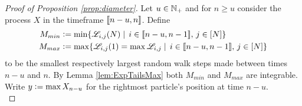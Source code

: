 \begin{proof}[Proof of Proposition \ref{prop:diameter}]
Let $u \in \mathbb{N}_+$ and for $n \geq u$ consider the process $X$ in the timeframe $\llbracket n - u, n\rrbracket$. Define 
\begin{align*}
M_{min} &\vcentcolon= \min\{ \mathscr{L}_{i, j}(N) \mid\, i \in \llbracket n-u, n-1\rrbracket,\, j \in [N]\} \\
M_{max} &\vcentcolon= \max\{ \mathscr{L}_{i, j}(1) = \max\mathscr{L}_{i,j} \mid\, i \in \llbracket n-u, n-1\rrbracket,\, j \in [N]\}
\end{align*} 
to be the smallest respectively largest random walk steps made between times $n-u$ and $n$. By Lemma \ref{lem:ExpTailsMax} both $M_{min}$ and $M_{max}$ are integrable. Write $y \vcentcolon= \max X_{n - u}$ for the rightmost particle's position at time $n-u$. \\


\end{proof}
